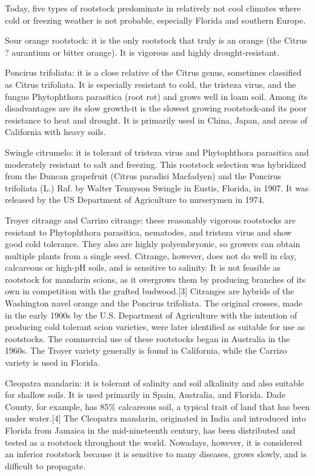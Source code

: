 \documentclass[
]{book}
\begin{document}
Today, five types of rootstock predominate in relatively not cool climates where cold or freezing weather is not probable, especially Florida and southern Europe.

Sour orange rootstock: it is the only rootstock that truly is an orange (the Citrus ? aurantium or bitter orange). It is vigorous and highly drought-resistant.

Poncirus trifoliata: it is a close relative of the Citrus genus, sometimes classified as Citrus trifoliata. It is especially resistant to cold, the tristeza virus, and the fungus Phytophthora parasitica (root rot) and grows well in loam soil. Among its disadvantages are its slow growth-it is the slowest growing rootstock-and its poor resistance to heat and drought. It is primarily used in China, Japan, and areas of California with heavy soils.

Swingle citrumelo: it is tolerant of tristeza virus and Phytophthora parasitica and moderately resistant to salt and freezing. This rootstock selection was hybridized from the Duncan grapefruit (Citrus paradisi Macfadyen) and the Poncirus trifoliata (L.) Raf. by Walter Tennyson Swingle in Eustis, Florida, in 1907. It was released by the US Department of Agriculture to nurserymen in 1974.

Troyer citrange and Carrizo citrange: these reasonably vigorous rootstocks are resistant to Phytophthora parasitica, nematodes, and tristeza virus and show good cold tolerance. They also are highly polyembryonic, so growers can obtain multiple plants from a single seed. Citrange, however, does not do well in clay, calcareous or high-pH soils, and is sensitive to salinity. It is not feasible as rootstock for mandarin scions, as it overgrows them by producing branches of its own in competition with the grafted budwood.{[}3{]} Citranges are hybrids of the Washington navel orange and the Poncirus trifoliata. The original crosses, made in the early 1900s by the U.S. Department of Agriculture with the intention of producing cold tolerant scion varieties, were later identified as suitable for use as rootstocks. The commercial use of these rootstocks began in Australia in the 1960s. The Troyer variety generally is found in California, while the Carrizo variety is used in Florida.

Cleopatra mandarin: it is tolerant of salinity and soil alkalinity and also suitable for shallow soils. It is used primarily in Spain, Australia, and Florida. Dade County, for example, has 85\% calcareous soil, a typical trait of land that has been under water.{[}4{]} The Cleopatra mandarin, originated in India and introduced into Florida from Jamaica in the mid-nineteenth century, has been distributed and tested as a rootstock throughout the world. Nowadays, however, it is considered an inferior rootstock because it is sensitive to many diseases, grows slowly, and is difficult to propagate.
\end{document}
